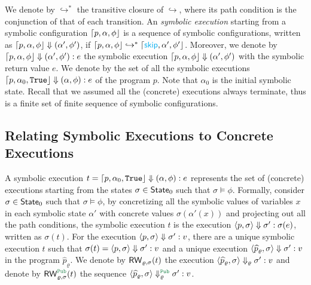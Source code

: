 We denote by $\hookrightarrow^*$ the transitive closure of $\hookrightarrow$, where its path condition %
is the conjunction of that of each transition. %
An \emph{symbolic execution} starting from a symbolic configuration $\lceil{p, \alpha,\phi}\rfloor$ is a sequence of symbolic configurations, written as $\lceil{p, \alpha,\phi}\rfloor\Downarrow
(\alpha',\phi')$,
if $\lceil{p, \alpha,\phi}\rfloor\hookrightarrow^* \lceil{{{\textcolor{cyan}{\sf skip}}}, \alpha',\phi'}\rfloor$.
Moreover, we denote by $\lceil{p, \alpha,\phi}\rfloor\Downarrow
(\alpha',\phi'):e$
the symbolic execution $\lceil{p, \alpha,\phi}\rfloor\Downarrow
(\alpha',\phi')$ with the symbolic return value $e$.
%
We denote by {\SymExe} the set of all the symbolic executions $\lceil{p, \alpha_0,{\tt True}}\rfloor\Downarrow
(\alpha,\phi):e$ of the program $p$.
Note that $\alpha_0$ is the initial symbolic state.
Recall that we assumed all the (concrete) executions always terminate,
thus {\SymExe} is a finite set of finite sequence of symbolic configurations.

\subsection{Relating Symbolic Executions to Concrete Executions}
A symbolic execution $t=\lceil{p, \alpha_0,{\tt True}}\rfloor\Downarrow
(\alpha,\phi):e$ represents the set of (concrete) executions
starting from the states $\sigma\in {\sf State}_0$ such that
$\sigma\models \phi$. Formally, consider $\sigma\in  {\sf State}_0$ such that
$\sigma\models \phi$, by concretizing all the symbolic values
of variables $x$ in each symbolic state $\alpha'$ with concrete values $\sigma(\alpha'(x))$ and projecting out all the path conditions,
the symbolic execution $t$ is the execution $\langle{p, \sigma}\rangle\Downarrow \sigma': \sigma(e)$, written as
$\sigma(t)$. For the execution $\langle{p, \sigma}\rangle\Downarrow \sigma': v$,
there are a unique symbolic execution $t$ such that $\sigma(t)=\langle{p, \sigma}\rangle\Downarrow \sigma': v$
and a unique execution $\langle{\widehat{p}_\varrho, \sigma}\rangle\Downarrow \sigma': v$ in the program $\widehat{p}_\varrho$.
We denote by ${\sf RW}_{\varrho,\sigma}(t)$
the execution $\langle{\widehat{p}_\varrho, \sigma}\rangle\Downarrow_\varrho \sigma': v$
and denote by $\RW_{\varrho,\sigma}^{\Pub}(t)$
the sequence $\MPCAngle{\widehat{p}_\varrho, \sigma}\Downarrow_\varrho^{\Pub} \sigma': v$.


